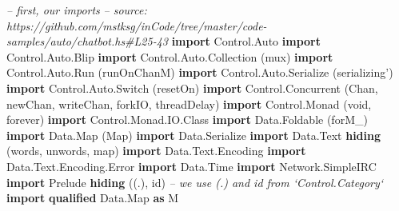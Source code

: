 \documentclass[]{article}
\newenvironment{Shaded}{\begin{snugshade}}{\end{snugshade}}
\newcommand{\CommentTok}[1]{\textcolor[rgb]{0.56,0.35,0.01}{\textit{#1}}}
\newcommand{\DataTypeTok}[1]{\textcolor[rgb]{0.13,0.29,0.53}{#1}}
\newcommand{\KeywordTok}[1]{\textcolor[rgb]{0.13,0.29,0.53}{\textbf{#1}}}
\newcommand{\NormalTok}[1]{#1}
\begin{document}
\begin{Shaded}
\begin{Highlighting}[]
\CommentTok{-- first, our imports}
\CommentTok{-- source: https://github.com/mstksg/inCode/tree/master/code-samples/auto/chatbot.hs#L25-43}
\KeywordTok{import} \DataTypeTok{Control.Auto}
\KeywordTok{import} \DataTypeTok{Control.Auto.Blip}
\KeywordTok{import} \DataTypeTok{Control.Auto.Collection}\NormalTok{  (mux)}
\KeywordTok{import} \DataTypeTok{Control.Auto.Run}\NormalTok{         (runOnChanM)}
\KeywordTok{import} \DataTypeTok{Control.Auto.Serialize}\NormalTok{   (serializing')}
\KeywordTok{import} \DataTypeTok{Control.Auto.Switch}\NormalTok{      (resetOn)}
\KeywordTok{import} \DataTypeTok{Control.Concurrent}\NormalTok{       (}\DataTypeTok{Chan}\NormalTok{, newChan, writeChan, forkIO, threadDelay)}
\KeywordTok{import} \DataTypeTok{Control.Monad}\NormalTok{            (void, forever)}
\KeywordTok{import} \DataTypeTok{Control.Monad.IO.Class}
\KeywordTok{import} \DataTypeTok{Data.Foldable}\NormalTok{            (forM_)}
\KeywordTok{import} \DataTypeTok{Data.Map}\NormalTok{                 (}\DataTypeTok{Map}\NormalTok{)}
\KeywordTok{import} \DataTypeTok{Data.Serialize}
\KeywordTok{import} \DataTypeTok{Data.Text} \KeywordTok{hiding}\NormalTok{         (words, unwords, map)}
\KeywordTok{import} \DataTypeTok{Data.Text.Encoding}
\KeywordTok{import} \DataTypeTok{Data.Text.Encoding.Error}
\KeywordTok{import} \DataTypeTok{Data.Time}
\KeywordTok{import} \DataTypeTok{Network.SimpleIRC}
\KeywordTok{import} \DataTypeTok{Prelude} \KeywordTok{hiding}\NormalTok{           ((.), id)   }\CommentTok{-- we use (.) and id from `Control.Category`}
\KeywordTok{import} \KeywordTok{qualified} \DataTypeTok{Data.Map}       \KeywordTok{as} \DataTypeTok{M}
\end{Highlighting}
\end{Shaded}
\end{document}
